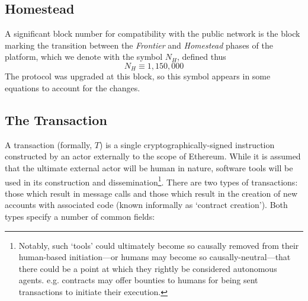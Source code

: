 \documentclass[9pt,oneside]{amsart}
\makeatletter
\newcommand{\firsthomesteadblock}{\ensuremath{N_H}}
\newcommand*\eg{e.g.\@\xspace}
\makeatother
\begin{document}
\begin{multicols}{2}
\subsection{Homestead} \label{ch:homestead}

A significant block number for compatibility with the public network is the block marking the transition between the {\it Frontier} and {\it Homestead} phases of the platform, which we denote with the symbol \firsthomesteadblock, defined thus
\begin{equation}
\firsthomesteadblock \equiv 1,\! 150,\! 000
\end{equation}
The protocol was upgraded at this block, so this symbol appears in some equations to account for the changes.

\subsection{The Transaction} \label{ch:transaction}

A transaction (formally, $T$) is a single cryptographically-signed instruction constructed by an actor externally to the scope of Ethereum. While it is assumed that the ultimate external actor will be human in nature, software tools will be used in its construction and dissemination\footnote{Notably, such `tools' could ultimately become so causally removed from their human-based initiation---or humans may become so causally-neutral---that there could be a point at which they rightly be considered autonomous agents. \eg contracts may offer bounties to humans for being sent transactions to initiate their execution.}. There are two types of transactions: those which result in message calls and those which result in the creation of new accounts with associated code (known informally as `contract creation'). Both types specify a number of common fields:


\end{multicols}
\end{document}
